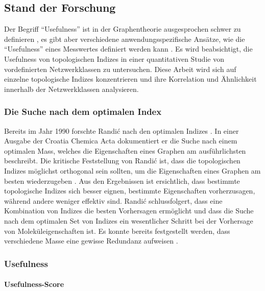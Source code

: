 \subsection{Stand der Forschung}

Der Begriff \enquote{Usefulness} ist in der Graphentheorie ausgesprochen schwer zu definieren \cite[p.~144]{ma_usefulness_2022}, es gibt aber verschiedene anwendungsspezifische Ansätze, wie die \enquote{Usefulness} eines Messwertes definiert werden kann \cite[p.~932]{basak_qspr_2000} \cite[p.~581]{raychaudhury_discrimination_1984}.
Es wird beabsichtigt, die Usefulness von topologischen Indizes in einer quantitativen Studie von vordefinierten Netzwerkklassen zu untersuchen.
Diese Arbeit wird sich auf einzelne topologische Indizes konzentrieren und ihre Korrelation und Ähnlichkeit innerhalb der Netzwerkklassen analysieren.

\subsubsection{Die Suche nach dem optimalen Index}

Bereits im Jahr 1990 forschte Randić nach den optimalen Indizes \cite{randic_croatica_nodate}.
In einer Ausgabe der Croatia Chemica Acta dokumentiert er die Suche nach einem optimalen Mass, welches die Eigenschaften eines Graphen am ausführlichsten beschreibt.
Die kritische Feststellung von Randić ist, dass die topologischen Indizes möglichst orthogonal sein sollten, um die Eigenschaften eines Graphen am besten wiederzugeben \cite{randic_croatica_nodate}.
Aus den Ergebnissen ist ersichtlich, dass bestimmte topologische Indizes sich besser eignen, bestimmte Eigenschaften vorherzusagen, während andere weniger effektiv sind. 
Randić schlussfolgert, dass eine Kombination von Indizes die besten Vorhersagen ermöglicht und dass die Suche nach dem optimalen Set von Indizes ein wesentlicher Schritt bei der Vorhersage von Moleküleigenschaften ist.
Es konnte bereits festgestellt werden, dass verschiedene Masse eine gewisse Redundanz aufweisen \cite{kraus_probabilistic_2014}. 

\subsubsection{Usefulness}

\paragraph{Usefulness-Score}


